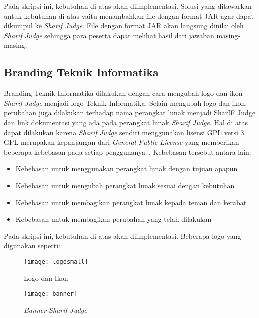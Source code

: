 Pada skripsi ini, kebutuhan di atas akan diimplementasi. %
Solusi yang ditawarkan untuk kebutuhan di atas yaitu menambahkan file dengan format JAR agar dapat dikumpul ke \textit{Sharif Judge}. File dengan format JAR akan langsung dinilai oleh \textit{Sharif Judge} sehingga para peserta dapat melihat hasil dari jawaban masing-masing.

\subsection{Branding Teknik Informatika}
Branding Teknik Informatika dilakukan dengan cara mengubah logo dan ikon \textit{Sharif Judge} menjadi logo Teknik Informatika. Selain mengubah logo dan ikon, perubahan juga dilakukan terhadap nama perangkat lunak menjadi SharIF Judge dan link dokumentasi yang ada pada perangkat lunak \textit{Sharif Judge}. Hal di atas dapat dilakukan karena \textit{Sharif Judge} sendiri menggunakan lisensi GPL versi 3. GPL merupakan kepanjangan dari \textit{General Public License} yang memberikan beberapa kebebasan pada setiap penggunanya~\cite{brett:09:moss}.
Kebebasan tersebut antara lain:
	\begin{itemize}
		\item Kebebasan untuk menggunakan perangkat lunak dengan tujuan apapun \\
		\item Kebebasan untuk mengubah perangkat lunak sesuai dengan kebutuhan \\
		\item Kebebasan untuk membagikan perangkat lunak kepada teman dan kerabat \\
		\item Kebebasan untuk membagikan perubahan yang telah dilakukan
	\end{itemize}
Pada skripsi ini, kebutuhan di atas akan diimplementasi. Beberapa logo yang digunakan seperti:

\begin{figure}[H]
	\centering  
	\texttt{[image: logosmall]}  
	\caption[Logo dan Ikon]{Logo dan Ikon} 
	\label{fig:logosmall} 
\end{figure} 

\begin{figure}[H]
	\centering  
	\texttt{[image: banner]}  
	\caption[\textit{Banner Sharif Judge}]{\textit{Banner Sharif Judge}} 
	\label{fig:banner} 
\end{figure} 

